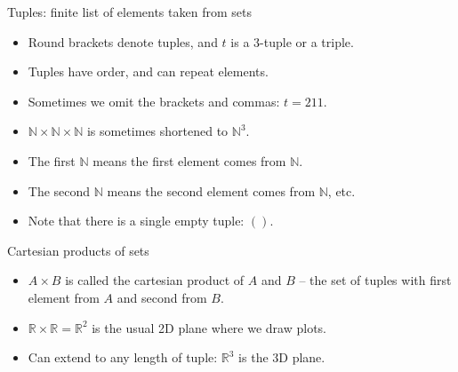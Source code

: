 \begin{frame}{Tuples: finite list of elements taken from sets}
  \begin{itemize}
    \setlength\itemsep{2mm}
    \item Round brackets denote tuples, and $t$ is a $3$-tuple or a triple.
    \item Tuples have order, and can repeat elements.
    \item Sometimes we omit the brackets and commas: $t = 211$.
    \item $\mathbb{N} \times \mathbb{N} \times \mathbb{N}$ is sometimes shortened to $\mathbb{N}^3$.
    \item The first $\mathbb{N}$ means the first element comes from $\mathbb{N}$.
    \item The second $\mathbb{N}$ means the second element comes from $\mathbb{N}$, etc.
    \item Note that there is a single empty tuple: $()$.
  \end{itemize}
\end{frame}


\begin{frame}[fragile]{Cartesian products of sets}
  
  \begin{itemize}
    \item $A \times B$ is called the cartesian product of $A$ and $B$ -- the set of tuples with first element from $A$ and second from $B$.
    \item $\mathbb{R} \times \mathbb{R} = \mathbb{R}^2$ is the usual 2D plane where we draw plots.
    \item Can extend to any length of tuple: $\mathbb{R}^3$ is the 3D plane.
  \end{itemize}

  \begin{center}
    \hspace{5mm}
  \end{center}
\end{frame}


